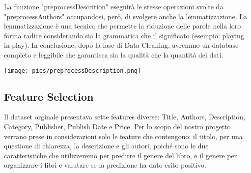 \documentclass[12pt,oneside]{article}
\begin{document}
\begin{enumerate}
\begin{justify}
    La funzione "preprocessDescrition" eseguirà le stesse operazioni svolte da "preprocessAuthors" occupandosi, però, di svolgere anche la lemmatizzazione. La lemmatizzazione è una tecnica che permette la riduzione delle parole nella loro forma radice considerando sia la grammatica che il significato (esempio: playing in play). 
    In conclusione, dopo la fase di Data Cleaning, avremmo un database completo e leggibile che garantisca sia la qualità che la quantità dei dati. 
    \end{justify}
    \texttt{[image: pics/preprocessDescription.png]}
    \end{enumerate}
    
    

    \begin{enumerate}
    \subsection{Feature Selection}
    \begin{justify}
    Il dataset orginale presentava sette features diverse: Title, Authors, Description, Category, Publisher, Publish Date e Price. Per lo scopo del nostro progetto verrano prese in considerazioni solo le feature che contengono: il titolo, per una questione di chiarezza, la descrizione e gli autori, poiché sono le due caratteristiche che utilizzeremo per predirre il genere del libro, e il genere per organizzare i libri e valutare se la predizione ha dato esito positivo.
    \end{justify}
    \end{enumerate}
\end{document}
